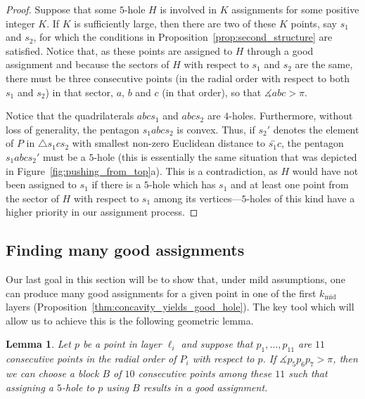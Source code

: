 \documentclass[12pt,reqno, a4paper]{amsart}
\newcounter{contSect} \numberwithin{contSect}{section}
\newtheorem{lemma}[contSect]{Lemma}
\begin{document}
\begin{proof}
    Suppose that some $5$-hole $H$ is involved in $K$ assignments for some positive integer $K$. If $K$ is sufficiently large, then there are two of these $K$ points, say $s_1$ and $s_2$, for which the conditions in Proposition~\ref{prop:second_structure} are satisfied. Notice that, as these points are assigned to $H$ through a good assignment and because the sectors of $H$ with respect to $s_1$ and $s_2$ are the same, there must be three consecutive points (in the radial order with respect to both $s_1$ and $s_2$) in that sector, $a$, $b$ and $c$ (in that order), so that $\measuredangle abc > \pi$. 
    
    Notice that the quadrilaterals $abcs_1$ and $abcs_2$ are $4$-holes. Furthermore, without loss of generality, the pentagon $s_1abcs_2$ is convex. Thus, if $s_2'$ denotes the element of $P$ in $\triangle s_1cs_2$ with smallest non-zero Euclidean distance to $\overleftrightarrow{s_1c}$, the pentagon $s_1abcs_2'$ must be a $5$-hole (this is essentially the same situation that was depicted in Figure~\ref{fig:pushing_from_top}a). This is a contradiction, as $H$ would have not been assigned to $s_1$ if there is a $5$-hole which has $s_1$ and at least one point from the sector of $H$ with respect to $s_1$ among its vertices---$5$-holes of this kind have a higher priority in our assignment process.
\end{proof}

\subsection*{Finding many good assignments} Our last goal in this section will be to show that, under mild assumptions, one can produce many good assignments for a given point in one of the first $k_{\operatorname{mid}}$ layers (Proposition~\ref{thm:concavity_yields_good_hole}).
The key tool which will allow us to achieve this is the following geometric lemma.

\begin{lemma}\label{lem:concavity_yields_good}
    Let $p$ be a point in layer $\ell_i$ and suppose that $p_1,\dots,p_{11}$ are $11$ consecutive points in the radial order of $P_i$ with respect to $p$. If $\measuredangle p_{5}p_6p_7>\pi$, then we can choose a block $B$ of $10$ consecutive points among these $11$ such that assigning a $5$-hole to $p$ using $B$ results in a good assignment.
\end{lemma}
\end{document}
